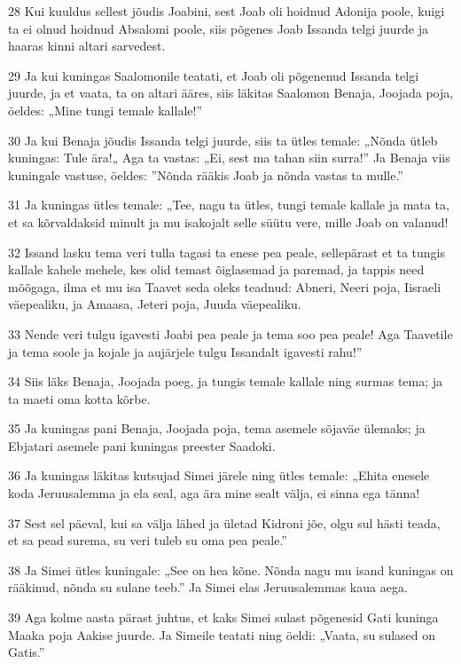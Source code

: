 \par 28 Kui kuuldus sellest jõudis Joabini, sest Joab oli hoidnud Adonija poole, kuigi ta ei olnud hoidnud Absalomi poole, siis põgenes Joab Issanda telgi juurde ja haaras kinni altari sarvedest.
\par 29 Ja kui kuningas Saalomonile teatati, et Joab oli põgenenud Issanda telgi juurde, ja et vaata, ta on altari ääres, siis läkitas Saalomon Benaja, Joojada poja, öeldes: „Mine tungi temale kallale!”
\par 30 Ja kui Benaja jõudis Issanda telgi juurde, siis ta ütles temale: „Nõnda ütleb kuningas: Tule ära!„ Aga ta vastas: „Ei, sest ma tahan siin surra!” Ja Benaja viis kuningale vastuse, öeldes: ”Nõnda rääkis Joab ja nõnda vastas ta mulle.”
\par 31 Ja kuningas ütles temale: „Tee, nagu ta ütles, tungi temale kallale ja mata ta, et sa kõrvaldaksid minult ja mu isakojalt selle süütu vere, mille Joab on valanud!
\par 32 Issand lasku tema veri tulla tagasi ta enese pea peale, sellepärast et ta tungis kallale kahele mehele, kes olid temast õiglasemad ja paremad, ja tappis need mõõgaga, ilma et mu isa Taavet seda oleks teadnud: Abneri, Neeri poja, Iisraeli väepealiku, ja Amaasa, Jeteri poja, Juuda väepealiku.
\par 33 Nende veri tulgu igavesti Joabi pea peale ja tema soo pea peale! Aga Taavetile ja tema soole ja kojale ja aujärjele tulgu Issandalt igavesti rahu!”
\par 34 Siis läks Benaja, Joojada poeg, ja tungis temale kallale ning surmas tema; ja ta maeti oma kotta kõrbe.
\par 35 Ja kuningas pani Benaja, Joojada poja, tema asemele sõjaväe ülemaks; ja Ebjatari asemele pani kuningas preester Saadoki.
\par 36 Ja kuningas läkitas kutsujad Simei järele ning ütles temale: „Ehita enesele koda Jeruusalemma ja ela seal, aga ära mine sealt välja, ei sinna ega tänna!
\par 37 Sest sel päeval, kui sa välja lähed ja ületad Kidroni jõe, olgu sul hästi teada, et sa pead surema, su veri tuleb su oma pea peale.”
\par 38 Ja Simei ütles kuningale: „See on hea kõne. Nõnda nagu mu isand kuningas on rääkinud, nõnda su sulane teeb.” Ja Simei elas Jeruusalemmas kaua aega.
\par 39 Aga kolme aasta pärast juhtus, et kaks Simei sulast põgenesid Gati kuninga Maaka poja Aakise juurde. Ja Simeile teatati ning öeldi: „Vaata, su sulased on Gatis.”
